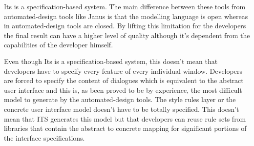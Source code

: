 Its is a specification-based system. The main difference between these tools from automated-design tools like Janus\cite{janus} is that the modelling language is open whereas in automated-design tools are closed. By lifting this limitation for the developers the final result can have a higher level of quality although it's dependent from the capabilities of the developer himself.

Even though Its is a specification-based system, this doesn't mean that developers have to specify every feature of every individual window. Developers are forced to specify the content of dialogues which is equivalent to the abstract user interface and this is, as been proved to be by experience, the most difficult model to generate by the automated-design tools. The style rules layer or the concrete user interface model doesn’t have to be totally specified. This doesn’t mean that ITS generates this model but that developers can reuse rule sets from libraries that contain the abstract to concrete mapping for significant portions of the interface specifications.
